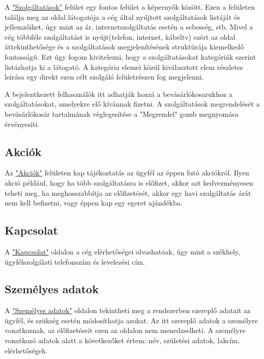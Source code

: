 \documentclass[centeredchapter]{thesis-ekf}
\theoremstyle{definition}
\theoremstyle{remark}
\begin{document}
A \hyperlink{leiras-szolgaltatasok}{"Szolgáltatások"} felület egy fontos felület a képernyők között. Ezen a felületen találja meg az oldal látogatója a cég által nyújtott szolgáltatások listáját és jellemzőiket, úgy mint az ár, internetszolgáltatás esetén a sebesség, stb. Mivel a cég többféle szolgáltatást is nyújt(telefon, internet, kábeltv) ezért az oldal áttekinthetősége és a szolgáltatások megjelenítésének struktúrája kiemelkedő fontosságú. Ezt úgy fogom kivitelezni, hogy a szolgáltatásokat kategóriák szerint listázhatja ki a látogató. A kategória elemei közül kiválasztott elem részletes leírása egy direkt ezen célt szolgáló felületrészen fog megjelenni.

A bejelentkezett felhasználók itt adhatják hozzá a bevásárlókosarukhoz a szolgáltatásokat, amelyekre elő kívánnak fizetni. A szolgáltatások megrendelését a bevásárlókosár tartalmának véglegesítése a "Megrendel" gomb megnyomása érvényesíti.

\subsection{Akciók}\hypertarget{leiras-akciok}{}

Az \hyperlink{leiras-akciok}{"Akciók"} felületen kap tájékoztatás az ügyfél az éppen futó akciókról. Ilyen akció például, hogy ha több szolgáltatásra is előfizet, akkor azt kedvezményesen teheti meg, ha meghosszabbítja az előfizetését, akkor egy havi szolgáltatás árát nem kell befizetni, vagy éppen kap egy egeret ajándékba.

\subsection{Kapcsolat}\hypertarget{leiras-kapcsolat}{}

A \hyperlink{leiras-kapcsolat}{"Kapcsolat"} oldalon a cég elérhetőségei olvashatóak, úgy mint a székhely, ügyfélszolgálati telefonszám és levelezési cím.

\subsection{Személyes adatok}\hypertarget{leiras-szemelyes}{}

A \hyperlink{leiras-szemelyes}{"Személyes adatok"} oldalon tekintheti meg a rendszerben szereplő adatait az ügyfél, és szükség esetén módosíthatja azokat. Az itt szereplő adatok a személyre vonatkoznak, az előfizetéseit ezen az oldalon nem menedzselheti. A személyre vonatkozó adatok alatt a következőket értem: név, születési adatok, lakcím, elérhetőségek.
\end{document}
